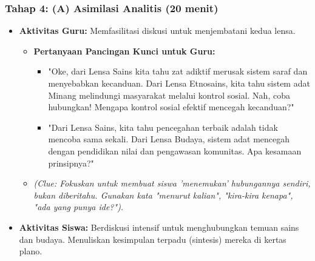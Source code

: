 \documentclass[a4paper,12pt]{article}
\begin{document}
\subsubsection{Tahap 4: (A) Asimilasi Analitis (20 menit)}
\begin{itemize}
\item \textbf{Aktivitas Guru:} Memfasilitasi diskusi untuk menjembatani kedua lensa.
    \begin{itemize}
    \item \textbf{Pertanyaan Pancingan Kunci untuk Guru:}
        \begin{itemize}
        \item "Oke, dari Lensa Sains kita tahu zat adiktif merusak sistem saraf dan menyebabkan kecanduan. Dari Lensa Etnosains, kita tahu sistem adat Minang melindungi masyarakat melalui kontrol sosial. Nah, coba hubungkan! Mengapa kontrol sosial efektif mencegah kecanduan?"
        \item "Dari Lensa Sains, kita tahu pencegahan terbaik adalah tidak mencoba sama sekali. Dari Lensa Budaya, sistem adat mencegah dengan pendidikan nilai dan pengawasan komunitas. Apa kesamaan prinsipnya?"
        \end{itemize}
    \item \textit{(Clue: Fokuskan untuk membuat siswa 'menemukan' hubungannya sendiri, bukan diberitahu. Gunakan kata "menurut kalian", "kira-kira kenapa", "ada yang punya ide?").}
    \end{itemize}
\item \textbf{Aktivitas Siswa:} Berdiskusi intensif untuk menghubungkan temuan sains dan budaya. Menuliskan kesimpulan terpadu (sintesis) mereka di kertas plano.
\end{itemize}
\end{document}
